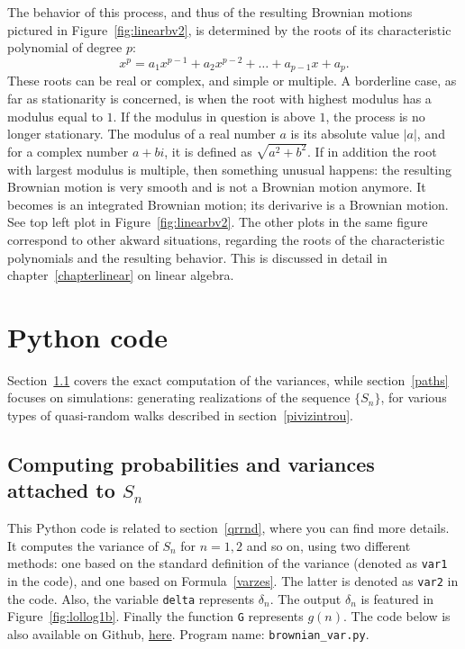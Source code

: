 \documentclass[oneside,10pt]{book}
\renewcommand{\arraystretch}{1.4} %
\begin{document}
The behavior of this process, and thus of the resulting Brownian motions pictured in Figure~\ref{fig:linearbv2}, is determined by the roots of
 its  \textcolor{index}{characteristic polynomial} of degree $p$:
$$
x^p=a_1 x^{p-1}+a_2 x^{p-2}+\dots + a_{p-1}x+ a_p.
$$
These roots can be real or complex, and simple or multiple. A borderline case, as far as stationarity is concerned, is when the root with highest modulus
 has  a \textcolor{index}{modulus} equal to $1$. If the modulus in question is above $1$, the process is no longer stationary. The modulus
 of a real number $a$ is its absolute value $|a|$, and for a complex number $a+bi$, it is defined as $\sqrt{a^2+b^2}$. If in addition the root
 with largest modulus is
 multiple, then something unusual happens: the resulting Brownian motion is very smooth and is not a Brownian motion anymore.
  It becomes is an integrated Brownian motion; its derivarive is a Brownian motion.  See top left plot in Figure~\ref{fig:linearbv2}. The other plots in the same figure correspond to other akward situations, regarding the roots of the characteristic polynomials and the resulting behavior. This is discussed in detail in chapter~\ref{chapterlinear} on linear algebra.




\renewcommand{\arraystretch}{1.0} %
\renewcommand{\arraystretch}{1.4} %

\section{Python code}\label{pythonviz}

Section~\ref{pypy1bv} covers the exact computation of the variances, while section~\ref{paths} focuses on simulations: generating realizations of
 the sequence $\{S_n\}$, for various types of quasi-random walks described in section~\ref{pivizintrou}.


\subsection{Computing probabilities and variances attached to $S_n$}\label{pypy1bv}

This Python code is related to section~\ref{qrrnd}, where you can find more details.
It computes the variance of $S_n$ for $n=1, 2$ and so on, using two different methods:
 one based on the standard definition of the variance (denoted as \texttt{var1} in the code), and one based
 on Formula~\ref{varzes}. The latter is denoted as \texttt{var2} in the code.  Also, the variable \texttt{delta}
 represents $\delta_n$. The output $\delta_n$ is featured in Figure~\ref{fig:lollog1b}.  Finally the function \texttt{G} represents $g(n)$.
The code below is also available on Github, \href{https://github.com/VincentGranville/Machine-Learning/blob/main/Source\%20Code/brownian_var.py}{here}.
Program name: \texttt{brownian\_var.py}. \\
\end{document}
